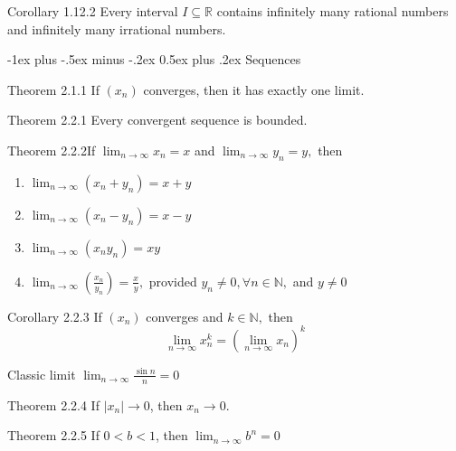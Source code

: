\documentclass[10pt,landscape]{article}
\makeatletter
\renewcommand{\section}{\@startsection{section}{1}{0mm}%
                                {-1ex plus -.5ex minus -.2ex}%
                                {0.5ex plus .2ex}%
                                {\normalfont\large\bfseries}}
\theoremstyle{definition}
\newcommand{\thistheoremname}{}
\newtheorem*{genericthm*}{\thistheoremname}
\newenvironment{namedthm*}[1]
{\renewcommand{\thistheoremname}{#1}\begin{genericthm*}}
{\end{genericthm*}}
\makeatother
\begin{document}
\begin{multicols}{3}
\begin{namedthm*}{Corollary 1.12.2}
  Every interval $I \subseteq \mathbb{R}$ contains infinitely many rational numbers and infinitely many irrational numbers.
\end{namedthm*}
\section{Sequences}
\begin{namedthm*}{Theorem 2.1.1}
   If $\left(x_{n}\right)$ converges, then it has exactly one limit.
\end{namedthm*}

\begin{namedthm*}{Theorem 2.2.1}
   Every convergent sequence is bounded.
\end{namedthm*}

\begin{namedthm*}{Theorem 2.2.2}If $\lim _{n \rightarrow \infty} x_{n}=x$ and $\lim _{n \rightarrow \infty} y_{n}=y,$ then
     ~
    \begin{enumerate}
        \item $\lim _{n \rightarrow \infty}\left(x_{n}+y_{n}\right)=x+y$
        \item $\lim _{n \rightarrow \infty}\left(x_{n}-y_{n}\right)=x-y$
        \item $\lim _{n \rightarrow \infty}\left(x_{n} y_{n}\right)=x y$
        \item $\lim _{n \rightarrow \infty}\left(\frac{x_{n}}{y_{n}}\right)=\frac{x}{y},$ provided $y_{n} \neq 0, \forall n \in \mathbb{N},$ and $y \neq 0$
    \end{enumerate}
\end{namedthm*}

\begin{namedthm*}{Corollary 2.2.3}
    If $\left(x_{n}\right)$ converges and $k \in \mathbb{N},$ then
$$
\lim _{n \rightarrow \infty} x_{n}^{k}=\left(\lim _{n \rightarrow \infty} x_{n}\right)^{k}
$$
\end{namedthm*}

\begin{namedthm*}{Classic limit}
   $\lim _{n \rightarrow \infty} \frac{\sin n}{n}=0$
\end{namedthm*}

\begin{namedthm*}{Theorem 2.2.4}
   If $|x_{n}| \rightarrow 0$, then $x_{n} \rightarrow 0.$
\end{namedthm*}
\begin{namedthm*}{Theorem 2.2.5}
   If $0 < b < 1$, then $\lim _{n \rightarrow \infty} b^{n}=0$
\end{namedthm*}


\end{multicols}
\end{document}
